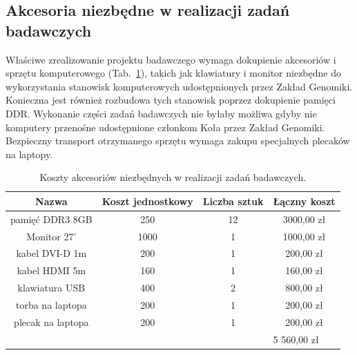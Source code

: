 \documentclass{article}
\begin{document}
\subsection{Akcesoria niezbędne w realizacji zadań badawczych}

Właściwe zrealizowanie projektu badawczego wymaga dokupienie akcesoriów i 
sprzętu komputerowego (Tab.~\ref{tab:akcesoria}), takich jak klawiatury i 
monitor niezbędne do wykorzystania stanowisk komputerowych udostępnionych przez 
Zakład Genomiki. Konieczna jest również rozbudowa tych stanowisk poprzez 
dokupienie pamięci DDR. Wykonanie części zadań badawczych nie byłaby możliwa 
gdyby nie komputery przenośne udostępnione członkom Koła przez Zakład Genomiki. 
Bezpieczny transport otrzymanego sprzętu wymaga zakupu specjalnych plecaków na 
laptopy.

\begin{table}[]
\centering
\caption{Koszty akcesoriów niezbędnych w realizacji zadań badawczych.}
\label{tab:akcesoria}
\begin{tabular}{cccc}
\hline
\multicolumn{1}{|c|}{Nazwa}             & \multicolumn{1}{c|}{Koszt jednostkowy} 
& \multicolumn{1}{c|}{Liczba sztuk} & \multicolumn{1}{c|}{Łączny koszt} \\ 
\hline
\multicolumn{1}{|c|}{pamięć DDR3 8GB}   & \multicolumn{1}{c|}{250}               
& \multicolumn{1}{c|}{12}           & \multicolumn{1}{c|}{3000,00 zł}   \\ 
\hline
\multicolumn{1}{|c|}{Monitor 27’}       & \multicolumn{1}{c|}{1000}              
& \multicolumn{1}{c|}{1}            & \multicolumn{1}{c|}{1000,00 zł}   \\ 
\hline
\multicolumn{1}{|c|}{kabel DVI-D 1m}    & \multicolumn{1}{c|}{200}               
& \multicolumn{1}{c|}{1}            & \multicolumn{1}{c|}{200,00 zł}    \\ 
\hline
\multicolumn{1}{|c|}{kabel HDMI 5m}     & \multicolumn{1}{c|}{160}               
& \multicolumn{1}{c|}{1}            & \multicolumn{1}{c|}{160,00 zł}    \\ 
\hline
\multicolumn{1}{|c|}{klawiatura USB}    & \multicolumn{1}{c|}{400}               
& \multicolumn{1}{c|}{2}            & \multicolumn{1}{c|}{800,00 zł}    \\ 
\hline
\multicolumn{1}{|c|}{torba na laptopa}  & \multicolumn{1}{c|}{200}               
& \multicolumn{1}{c|}{1}            & \multicolumn{1}{c|}{200,00 zł}    \\ 
\hline
\multicolumn{1}{|c|}{plecak na laptopa} & \multicolumn{1}{c|}{200}               
& \multicolumn{1}{c|}{1}            & \multicolumn{1}{c|}{200,00 zł}    \\ 
\hline
\multicolumn{1}{l}{}                    & \multicolumn{1}{l}{}                   
& \multicolumn{1}{l}{}              & \multicolumn{1}{l}{5 560,00 zł}   
\end{tabular}
\end{table}
\end{document}
